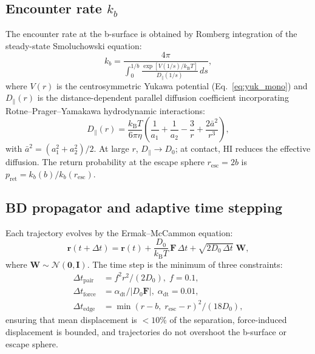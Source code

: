 \documentclass[journal=jctcce,manuscript=article,layout=twocolumn]{achemso}
\newcommand{\kBT}{k_{\mathrm{B}}T}
\begin{document}
\subsection{Encounter rate $k_b$}

The encounter rate at the b-surface is obtained by Romberg
integration of the steady-state Smoluchowski
equation:~\cite{Smoluchowski1917}
\begin{equation}
k_b = \frac{4\pi}{\displaystyle\int_0^{1/b}
  \frac{\exp\!\left[V(1/s)/\kBT\right]}{D_\parallel(1/s)}\,ds},
\label{eq:kb}
\end{equation}
where $V(r)$ is the centrosymmetric Yukawa potential
(Eq.~\ref{eq:yuk_mono}) and $D_\parallel(r)$ is the
distance-dependent parallel diffusion coefficient incorporating
Rotne--Prager--Yamakawa hydrodynamic interactions:~\cite{Zuk2014}
\begin{equation}
D_\parallel(r) = \frac{\kBT}{6\pi\eta}
\left(\frac{1}{a_1}+\frac{1}{a_2}
-\frac{3}{r}+\frac{2\bar{a}^2}{r^3}\right),
\label{eq:Dpar}
\end{equation}
with $\bar{a}^2 = (a_1^2 + a_2^2)/2$.
At large $r$, $D_\parallel \to D_0$; at contact, HI reduces the
effective diffusion.
The return probability at the escape sphere
$r_\mathrm{esc} = 2b$ is $p_\mathrm{ret} = k_b(b)/k_b(r_\mathrm{esc})$.

\subsection{BD propagator and adaptive time stepping}

Each trajectory evolves by the Ermak--McCammon
equation:~\cite{Ermak1978}
\begin{equation}
\mathbf{r}(t{+}\Delta t) = \mathbf{r}(t)
  + \frac{D_0}{\kBT}\,\mathbf{F}\,\Delta t
  + \sqrt{2D_0\,\Delta t}\;\mathbf{W},
\label{eq:ermak}
\end{equation}
where $\mathbf{W} \sim \mathcal{N}(\mathbf{0},\mathbf{I})$.
The time step is the minimum of three constraints:
\begin{align}
\Delta t_\mathrm{pair} &= f^2 r^2/(2D_0),\; f = 0.1, \\
\Delta t_\mathrm{force} &= \alpha_\mathrm{dt}/|D_0\mathbf{F}|,\;
  \alpha_\mathrm{dt} = 0.01, \\
\Delta t_\mathrm{edge} &= \min(r{-}b,\;r_\mathrm{esc}{-}r)^2/(18D_0),
\end{align}
ensuring that mean displacement is $<10\%$ of the separation,
force-induced displacement is bounded, and trajectories do not
overshoot the b-surface or escape sphere.
\end{document}
